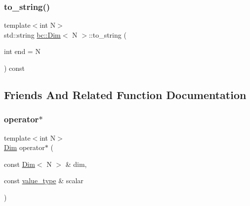 \subsubsection{\texorpdfstring{to\+\_\+string()}{to\_string()}\hspace{0.1cm}{\footnotesize\ttfamily [2/2]}}
{\footnotesize\ttfamily template$<$int N$>$ \\
std\+::string \hyperlink{structbc_1_1Dim}{bc\+::\+Dim}$<$ N $>$\+::to\+\_\+string (\begin{DoxyParamCaption}\item[{int}]{end = {\ttfamily N} }\end{DoxyParamCaption}) const\hspace{0.3cm}{\ttfamily [inline]}}



\subsection{Friends And Related Function Documentation}
\mbox{\label{structbc_1_1Dim_aeb1b6346b70a44bb31ea8fd24e2df421}} 
\subsubsection{\texorpdfstring{operator$\ast$}{operator*}\hspace{0.1cm}{\footnotesize\ttfamily [1/2]}}
{\footnotesize\ttfamily template$<$int N$>$ \\
\hyperlink{structbc_1_1Dim}{Dim} operator$\ast$ (\begin{DoxyParamCaption}\item[{const \hyperlink{structbc_1_1Dim}{Dim}$<$ N $>$ \&}]{dim,  }\item[{const \hyperlink{structbc_1_1Dim_af59ff554825273cf6bd9619b2c78c196}{value\+\_\+type} \&}]{scalar }\end{DoxyParamCaption})\hspace{0.3cm}{\ttfamily [friend]}}

\mbox{\label{structbc_1_1Dim_afef48b7e321245da75b424908e79f0f1}} 
